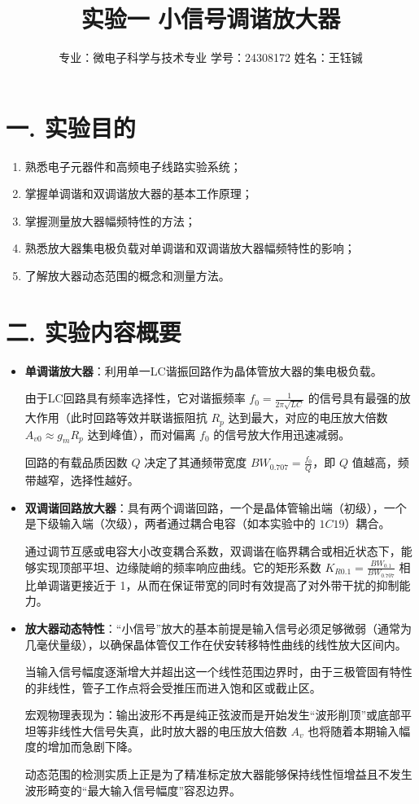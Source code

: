 \documentclass[12pt]{article}
\title{\Huge \textbf{实验一 小信号调谐放大器}}
\author{专业：微电子科学与技术专业 \quad 学号：24308172 \quad 姓名：王钰铖}
\date{}
\begin{document}
\maketitle

\section*{一. 实验目的}
\begin{enumerate}
    \item 熟悉电子元器件和高频电子线路实验系统；
    \item 掌握单调谐和双调谐放大器的基本工作原理；
    \item 掌握测量放大器幅频特性的方法；
    \item 熟悉放大器集电极负载对单调谐和双调谐放大器幅频特性的影响；
    \item 了解放大器动态范围的概念和测量方法。
\end{enumerate}

\section*{二. 实验内容概要}

\vspace{1em}
\begin{itemize}
    \item \textbf{单调谐放大器}：利用单一LC谐振回路作为晶体管放大器的集电极负载。
    
       由于LC回路具有频率选择性，它对谐振频率 $f_0 = \frac{1}{2\pi\sqrt{LC}}$ 的信号具有最强的放大作用（此时回路等效并联谐振阻抗 $R_p$ 达到最大，对应的电压放大倍数 $A_{v0} \approx g_m R_p$ 达到峰值），而对偏离 $f_0$ 的信号放大作用迅速减弱。
     
       回路的有载品质因数 $Q$ 决定了其通频带宽度 $BW_{0.707} = \frac{f_0}{Q}$，即 $Q$ 值越高，频带越窄，选择性越好。
    \item \textbf{双调谐回路放大器}：具有两个调谐回路，一个是晶体管输出端（初级），一个是下级输入端（次级），两者通过耦合电容（如本实验中的 $1C19$）耦合。
    
           通过调节互感或电容大小改变耦合系数，双调谐在临界耦合或相近状态下，能够实现顶部平坦、边缘陡峭的频率响应曲线。它的矩形系数 $K_{R0.1} = \frac{BW_{0.1}}{BW_{0.707}}$ 相比单调谐更接近于 1，从而在保证带宽的同时有效提高了对外带干扰的抑制能力。
    \item \textbf{放大器动态特性}：“小信号”放大的基本前提是输入信号必须足够微弱（通常为几毫伏量级），以确保晶体管仅工作在伏安转移特性曲线的线性放大区间内。
    
    当输入信号幅度逐渐增大并超出这一个线性范围边界时，由于三极管固有特性的非线性，管子工作点将会受推压而进入饱和区或截止区。
    
    宏观物理表现为：输出波形不再是纯正弦波而是开始发生“波形削顶”或底部平坦等非线性大信号失真，此时放大器的电压放大倍数 $A_v$ 也将随着本期输入幅度的增加而急剧下降。
    
    动态范围的检测实质上正是为了精准标定放大器能够保持线性恒增益且不发生波形畸变的“最大输入信号幅度”容忍边界。
\end{itemize}
\end{document}
